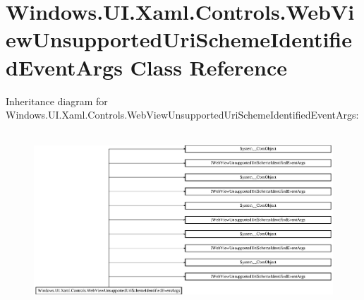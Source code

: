\hypertarget{class_windows_1_1_u_i_1_1_xaml_1_1_controls_1_1_web_view_unsupported_uri_scheme_identified_event_args}{}\section{Windows.\+U\+I.\+Xaml.\+Controls.\+Web\+View\+Unsupported\+Uri\+Scheme\+Identified\+Event\+Args Class Reference}
\label{class_windows_1_1_u_i_1_1_xaml_1_1_controls_1_1_web_view_unsupported_uri_scheme_identified_event_args}
Inheritance diagram for Windows.\+U\+I.\+Xaml.\+Controls.\+Web\+View\+Unsupported\+Uri\+Scheme\+Identified\+Event\+Args\+:\begin{figure}[H]
\begin{center}
\leavevmode
\includegraphics[height=6.595289cm]{class_windows_1_1_u_i_1_1_xaml_1_1_controls_1_1_web_view_unsupported_uri_scheme_identified_event_args}
\end{center}
\end{figure}
